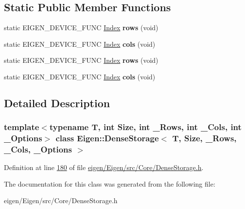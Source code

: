 \subsection*{Static Public Member Functions}
\begin{DoxyCompactItemize}
\item 
\mbox{\label{class_eigen_1_1_dense_storage_a14b68f709f5fb46eeebb203266cc29b2}} 
static E\+I\+G\+E\+N\+\_\+\+D\+E\+V\+I\+C\+E\+\_\+\+F\+U\+NC \hyperlink{namespace_eigen_a62e77e0933482dafde8fe197d9a2cfde}{Index} {\bfseries rows} (void)
\item 
\mbox{\label{class_eigen_1_1_dense_storage_aef23781f9dc545e8b3f6b75d6c05d777}} 
static E\+I\+G\+E\+N\+\_\+\+D\+E\+V\+I\+C\+E\+\_\+\+F\+U\+NC \hyperlink{namespace_eigen_a62e77e0933482dafde8fe197d9a2cfde}{Index} {\bfseries cols} (void)
\item 
\mbox{\label{class_eigen_1_1_dense_storage_a14b68f709f5fb46eeebb203266cc29b2}} 
static E\+I\+G\+E\+N\+\_\+\+D\+E\+V\+I\+C\+E\+\_\+\+F\+U\+NC \hyperlink{namespace_eigen_a62e77e0933482dafde8fe197d9a2cfde}{Index} {\bfseries rows} (void)
\item 
\mbox{\label{class_eigen_1_1_dense_storage_aef23781f9dc545e8b3f6b75d6c05d777}} 
static E\+I\+G\+E\+N\+\_\+\+D\+E\+V\+I\+C\+E\+\_\+\+F\+U\+NC \hyperlink{namespace_eigen_a62e77e0933482dafde8fe197d9a2cfde}{Index} {\bfseries cols} (void)
\end{DoxyCompactItemize}


\subsection{Detailed Description}
\subsubsection*{template$<$typename T, int Size, int \+\_\+\+Rows, int \+\_\+\+Cols, int \+\_\+\+Options$>$\newline
class Eigen\+::\+Dense\+Storage$<$ T, Size, \+\_\+\+Rows, \+\_\+\+Cols, \+\_\+\+Options $>$}



Definition at line \hyperlink{eigen_2_eigen_2src_2_core_2_dense_storage_8h_source_l00180}{180} of file \hyperlink{eigen_2_eigen_2src_2_core_2_dense_storage_8h_source}{eigen/\+Eigen/src/\+Core/\+Dense\+Storage.\+h}.



The documentation for this class was generated from the following file\+:\begin{DoxyCompactItemize}
\item 
eigen/\+Eigen/src/\+Core/\+Dense\+Storage.\+h\end{DoxyCompactItemize}
